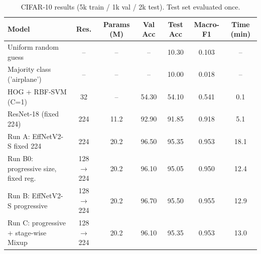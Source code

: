 \begin{table}[t]
\centering\small
\caption{CIFAR-10 results (5k train / 1k val / 2k test). Test set evaluated once.}
\label{tab:main}
\begin{tabular}{lcccccc}
\toprule
Model & Res. & Params (M) & Val Acc & Test Acc & Macro-F1 & Time (min) \\
\midrule
Uniform random guess & – & – & – & 10.30 & 0.103 & – \\
Majority class ('airplane') & – & – & – & 10.00 & 0.018 & – \\
HOG + RBF-SVM (C=1) & 32 & – & 54.30 & 54.10 & 0.541 & 0.1 \\
ResNet-18 (fixed 224) & 224 & 11.2 & 92.90 & 91.85 & 0.918 & 5.1 \\
Run A: EffNetV2-S fixed 224 & 224 & 20.2 & 96.50 & 95.35 & 0.953 & 18.1 \\
Run B0: progressive size, fixed reg. & 128$\to$224 & 20.2 & 96.10 & 95.05 & 0.950 & 12.4 \\
Run B: EffNetV2-S progressive & 128$\to$224 & 20.2 & 96.70 & 95.50 & 0.955 & 12.9 \\
Run C: progressive + stage-wise Mixup & 128$\to$224 & 20.2 & 96.10 & 95.35 & 0.953 & 13.0 \\
\bottomrule
\end{tabular}
\end{table}
